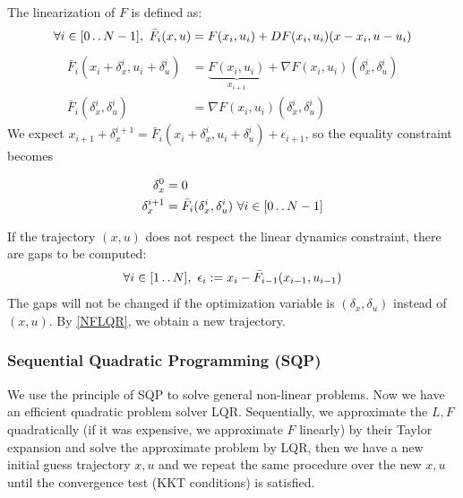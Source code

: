 \documentclass{report}
\newcommand{\twodots}{\mathinner {\ldotp \ldotp}}
\begin{document}
\medskip
The linearization of $F$ is defined as:
\[
\forall i \in [0 \twodots N-1] , \ \bar{F}_i(x, u) = F(x_i, u_i) + DF(x_i, u_i)(x - x_i, u -u_i)
\]
\begin{equation}
\begin{split}
\bar{F}_i(x_i + \delta_x^i, u_i + \delta_u^i) &=  \underbrace{F(x_i, u_i)}_{x_{i+1}} + \nabla F(x_i, u_i) (\delta_x^i, \delta_u^i) \\
\bar{F}_i(\delta_x^i, \delta_u^i) &=  \nabla F(x_i, u_i) (\delta_x^i, \delta_u^i)
\end{split}
\end{equation}
We expect $x_{i+1} + \delta_x^{i+1} = \bar{F}_i (x_i + \delta_x^i, u_i + \delta_u^i) + \epsilon_{i+1}$,
so the equality constraint becomes 
\begin{tcolorbox}
\begin{equation}
\begin{aligned}
\delta_x^0 &= 0
\\
\delta_x^{i+1} &= \bar{F}_i(\delta_x^i, \delta_u^i) 
 \ \forall i \in [0 \twodots N-1] 
\end{aligned}
\end{equation}
\end{tcolorbox}
If the trajectory $(x, u)$ does not respect the linear dynamics constraint, there are gaps to be computed:
\begin{equation}
\forall i \in [1 \twodots N], \ \epsilon_i := x_i - \bar{F}_{i-1}(x_{i-1}, u_{i-1})
\end{equation}
The gaps will not be changed if the optimization variable is $(\delta_x, \delta_u)$ instead of $(x,u)$. By \ref{NFLQR}, we obtain a new trajectory.

\subsubsection{Sequential Quadratic Programming (SQP)}
We use the principle of SQP to solve general non-linear problems. Now we have an efficient quadratic problem solver LQR. Sequentially, we approximate the $L, F$ quadratically (if it was expensive, we approximate $F$ linearly) by their Taylor expansion and solve the approximate problem by LQR, then we have a new initial guess trajectory $x, u$ and we repeat the same procedure over the new $x,u$ until the convergence test (KKT conditions) is satisfied.
\end{document}
